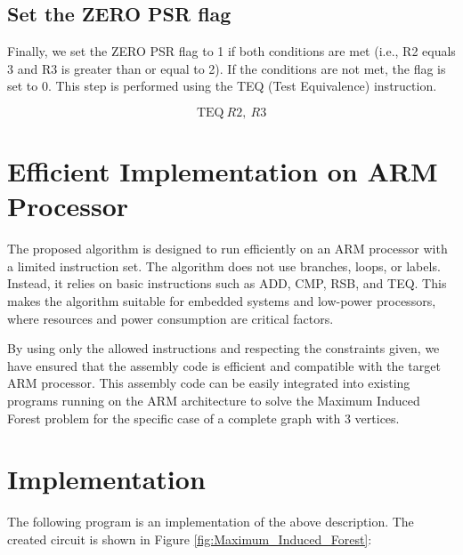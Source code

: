 \subsection{Set the ZERO PSR flag}

Finally, we set the ZERO PSR flag to 1 if both conditions are met (i.e., R2 equals 3 and R3 is greater than or equal to 2). If the conditions are not met, the flag is set to 0. This step is performed using the TEQ (Test Equivalence) instruction.

\begin{equation}
    \text{TEQ}\ R2,\ R3
\end{equation}

\section{Efficient Implementation on ARM Processor}

The proposed algorithm is designed to run efficiently on an ARM processor with a limited instruction set. The algorithm does not use branches, loops, or labels. Instead, it relies on basic instructions such as ADD, CMP, RSB, and TEQ. This makes the algorithm suitable for embedded systems and low-power processors, where resources and power consumption are critical factors.

By using only the allowed instructions and respecting the constraints given, we have ensured that the assembly code is efficient and compatible with the target ARM processor. This assembly code can be easily integrated into existing programs running on the ARM architecture to solve the Maximum Induced Forest problem for the specific case of a complete graph with 3 vertices.



\section{Implementation}

The following program is an implementation of the above description. The created circuit is shown in Figure \ref{fig:Maximum_Induced_Forest}:

